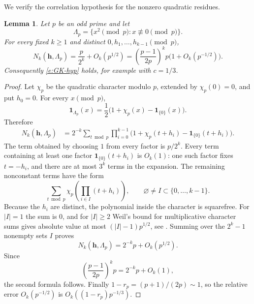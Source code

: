\documentclass[12pt,reqno]{amsart}
\numberwithin{equation}{section}
\newtheorem{lemma}[equation]{Lemma}
\theoremstyle{definition}
\theoremstyle{remark}
\begin{document}
We verify the correlation hypothesis for the nonzero quadratic
residues.

\begin{lemma}\label{l:quadratic-GK}
Let $p$ be an odd prime and let
\[
 \Lambda_p=\{x^2\pmod p:x\not\equiv0\pmod p\}.
\]
For every fixed $k\geq1$ and distinct
$0,h_1,\ldots,h_{k-1}\pmod p$,
\[
 N_k(\mathbf h,\Lambda_p)=\frac{p}{2^k}+O_k(p^{1/2})
 =\left(\frac{p-1}{2p}\right)^kp\big(1+O_k(p^{-1/2})\big).
\]
Consequently \eqref{e:GK-hyp} holds, for example with $c=1/3$.
\end{lemma}

\begin{proof}
Let $\chi_p$ be the quadratic character modulo $p$, extended by
$\chi_p(0)=0$, and put $h_0=0$.  For every $x\pmod p$,
\[
 \mathbf1_{\Lambda_p}(x)
   =\frac12\big(1+\chi_p(x)-\mathbf1_{\{0\}}(x)\big).
\]
Therefore
\begin{align*}
 N_k(\mathbf h,\Lambda_p)
 &=2^{-k}\sum_{t\bmod p}\prod_{i=0}^{k-1}
     \big(1+\chi_p(t+h_i)-\mathbf1_{\{0\}}(t+h_i)\big).
\end{align*}
The term obtained by choosing $1$ from every factor is $p/2^k$.
Every term containing at least one factor
$\mathbf1_{\{0\}}(t+h_i)$ is $O_k(1)$: one such factor fixes
$t=-h_i$, and there are at most $3^k$ terms in the expansion.
The remaining nonconstant terms have the form
\[
 \sum_{t\bmod p}\chi_p\!\left(\prod_{i\in I}(t+h_i)\right),
 \qquad \varnothing\ne I\subset\{0,\ldots,k-1\}.
\]
Because the $h_i$ are distinct, the polynomial inside the character is
squarefree.  For $|I|=1$ the sum is $0$, and for $|I|\geq2$ Weil's bound for
multiplicative character sums gives absolute value at most
$(|I|-1)p^{1/2}$, see \cite[Section 11.1]{iwaniec}.  Summing over the $2^k-1$ nonempty sets $I$ proves
\[
 N_k(\mathbf h,\Lambda_p)=2^{-k}p+O_k(p^{1/2}).
\]
Since
\[
 \left(\frac{p-1}{2p}\right)^kp
   =2^{-k}p+O_k(1),
\]
the second formula follows.  Finally $1-r_p=(p+1)/(2p)\sim 1$, so the
relative error $O_k(p^{-1/2})$ is
$O_k((1-r_p)p^{-1/3})$.
\end{proof}
\end{document}
